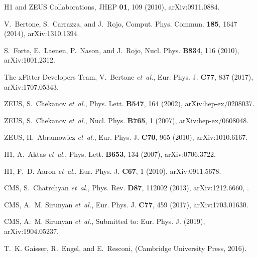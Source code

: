 \documentclass[12pt]{article}
\begin{document}
\begin{thebibliography}{99}
{H1 and ZEUS Collaborations},
\newblock JHEP {\bf 01}, 109 (2010), arXiv:0911.0884.

V.~Bertone, S.~Carrazza, and J.~Rojo,
\newblock Comput. Phys. Commun. {\bf 185}, 1647 (2014), arXiv:1310.1394.

S.~Forte, E.~Laenen, P.~Nason, and J.~Rojo,
\newblock Nucl. Phys. {\bf B834}, 116 (2010), arXiv:1001.2312.

The xFitter Developers Team, V.~Bertone {\em et~al.},
\newblock Eur. Phys. J. {\bf C77}, 837 (2017), arXiv:1707.05343.

ZEUS, S.~Chekanov {\em et~al.},
\newblock Phys. Lett. {\bf B547}, 164 (2002), arXiv:hep-ex/0208037.

ZEUS, S.~Chekanov {\em et~al.},
\newblock Nucl. Phys. {\bf B765}, 1 (2007), arXiv:hep-ex/0608048.

ZEUS, H.~Abramowicz {\em et~al.},
\newblock Eur. Phys. J. {\bf C70}, 965 (2010), arXiv:1010.6167.

H1, A.~Aktas {\em et~al.},
\newblock Phys. Lett. {\bf B653}, 134 (2007), arXiv:0706.3722.

H1, F.~D. Aaron {\em et~al.},
\newblock Eur. Phys. J. {\bf C67}, 1 (2010), arXiv:0911.5678.

CMS, S.~Chatrchyan {\em et~al.},
\newblock Phys. Rev. {\bf D87}, 112002 (2013), arXiv:1212.6660,
.

CMS, A.~M. Sirunyan {\em et~al.},
\newblock Eur. Phys. J. {\bf C77}, 459 (2017), arXiv:1703.01630.

CMS, A.~M. Sirunyan {\em et~al.},
\newblock Submitted to: Eur. Phys. J.  (2019), arXiv:1904.05237.

T.~K. Gaisser, R.~Engel, and E.~Resconi,
 (Cambridge University Press,
  2016).


\end{thebibliography}
\end{document}

